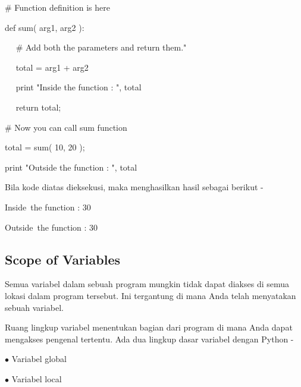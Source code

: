 \vspace{12pt}
\noindent 
 \hspace*{0.5in}  $  \#  $ Function definition is here \par
\noindent 
 \hspace*{0.5in} def sum( arg1, arg2 ): \par
\noindent 
 \hspace*{0.5in} ~~  $  \#  $ Add both the parameters and return them." \par
\noindent 
 \hspace*{0.5in} ~~ total = arg1 + arg2 \par
\noindent 
 \hspace*{0.5in} ~~ print "Inside the function : ", total \par
\noindent 
 \hspace*{0.5in} ~~ return total; \par
\vspace{12pt}
\noindent 
 \hspace*{0.5in}  $  \#  $ Now you can call sum function \par
\noindent 
 \hspace*{0.5in} total = sum( 10, 20 ); \par
\noindent 
 \hspace*{0.5in} print "Outside the function : ", total  \par
 \vspace{\baselineskip}
\noindent 
Bila kode diatas dieksekusi, maka menghasilkan hasil sebagai berikut - \par
\noindent 
 \hspace*{0.5in} Inside~the function :  30 \par
\noindent 
 \hspace*{0.5in} Outside~the function :  30 \par
\noindent 
\subsection{Scope of Variables }
\noindent 
Semua variabel dalam sebuah program mungkin tidak dapat diakses di semua lokasi dalam program tersebut. Ini tergantung di mana Anda telah menyatakan sebuah variabel. \par
\noindent 
Ruang lingkup variabel menentukan bagian dari program di mana Anda dapat mengakses pengenal tertentu. Ada dua lingkup dasar variabel dengan Python - \par
\noindent 
 \hspace*{0.5in}  $ \bullet $ Variabel global \par
\noindent 
 \hspace*{0.5in}  $ \bullet $ Variabel local \par
\vspace{12pt}
\noindent 
